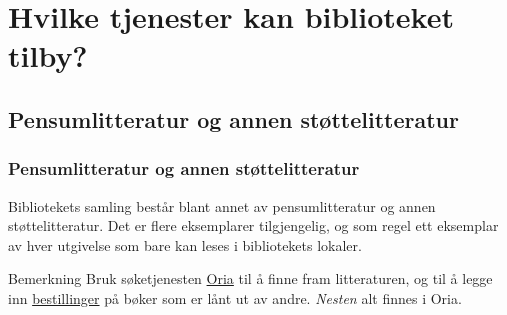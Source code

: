 \section{Hvilke tjenester kan biblioteket tilby?}
\subsection{Pensumlitteratur og annen støttelitteratur}
\begin{frame}
  \frametitle{Pensumlitteratur og annen støttelitteratur}
  Bibliotekets samling består blant annet av \alert{pensumlitteratur} og annen \alert{støttelitteratur}. Det er flere eksemplarer tilgjengelig, og som regel ett eksemplar av hver utgivelse som bare kan leses i bibliotekets lokaler.

  \vfill

  \begin{block}{Bemerkning}
    Bruk søketjenesten \href{http://bibsys-almaprimo.hosted.exlibrisgroup.com/primo_library/libweb/action/search.do?vid=DMMH}{Oria} til å finne fram litteraturen, og til å legge inn \href{https://dmmh.no/bibliotek/bestillinger}{bestillinger} på bøker som er lånt ut av andre. \textit{Nesten} alt finnes i Oria.
  \end{block}
\end{frame}

